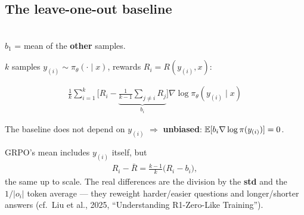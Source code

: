 \subsection{The leave-one-out baseline}

\begin{minipage}[c]{0.44\linewidth}
\centering
{}\\
{\scriptsize $b_1$ = mean of the \textbf{other} samples.}
\end{minipage}\hfill
\begin{minipage}[c]{0.53\linewidth}
$k$ samples $y_{(i)}\sim\pi_\theta(\cdot\mid x)$, rewards $R_i=R(y_{(i)},x)$:
\begin{eqbox}
\begin{gather*}
  \frac1k\sum_{i=1}^k\Big[R_i-\underbrace{\frac{1}{k-1}\sum_{j\ne i}R_j}_{b_i}\Big]\nabla\log\pi_\theta(y_{(i)}\mid x)
\end{gather*}
\end{eqbox}
The baseline does not depend on $y_{(i)}$ $\Rightarrow$ \textbf{unbiased}: $\mathbb{E}[b_i\nabla\log\pi(y_{(i)})]=0$.
\end{minipage}

\begin{slatebox}[title={GRPO's mean vs.\ leave-one-out}]
GRPO's mean includes $y_{(i)}$ itself, but
\begin{gather*}
  R_i-\bar R = \tfrac{k-1}{k}\big(R_i-b_i\big),
\end{gather*}
the same up to scale. The real differences are the division by the \textbf{std} and the $1/|o_i|$ token average --- they reweight harder/easier questions and longer/shorter answers (cf.\ Liu et al., 2025, ``Understanding R1-Zero-Like Training'').
\end{slatebox}

